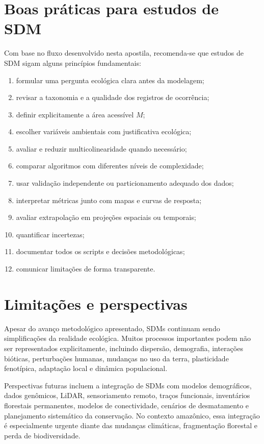 \section{Boas práticas para estudos de SDM}

Com base no fluxo desenvolvido nesta apostila, recomenda-se que estudos de SDM sigam alguns princípios fundamentais:

\begin{enumerate}
	\item formular uma pergunta ecológica clara antes da modelagem;
	\item revisar a taxonomia e a qualidade dos registros de ocorrência;
	\item definir explicitamente a área acessível \(M\);
	\item escolher variáveis ambientais com justificativa ecológica;
	\item avaliar e reduzir multicolinearidade quando necessário;
	\item comparar algoritmos com diferentes níveis de complexidade;
	\item usar validação independente ou particionamento adequado dos dados;
	\item interpretar métricas junto com mapas e curvas de resposta;
	\item avaliar extrapolação em projeções espaciais ou temporais;
	\item quantificar incertezas;
	\item documentar todos os scripts e decisões metodológicas;
	\item comunicar limitações de forma transparente.
\end{enumerate}

\section{Limitações e perspectivas}

Apesar do avanço metodológico apresentado, SDMs continuam sendo simplificações da realidade ecológica. Muitos processos importantes podem não ser representados explicitamente, incluindo dispersão, demografia, interações bióticas, perturbações humanas, mudanças no uso da terra, plasticidade fenotípica, adaptação local e dinâmica populacional.

Perspectivas futuras incluem a integração de SDMs com modelos demográficos, dados genômicos, LiDAR, sensoriamento remoto, traços funcionais, inventários florestais permanentes, modelos de conectividade, cenários de desmatamento e planejamento sistemático da conservação. No contexto amazônico, essa integração é especialmente urgente diante das mudanças climáticas, fragmentação florestal e perda de biodiversidade.

